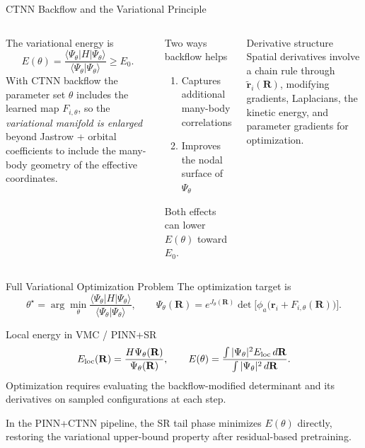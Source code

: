 \documentclass[aspectratio=169,10pt]{beamer}
\begin{document}
\begin{frame}{CTNN Backflow and the Variational Principle}
  \begin{columns}[T]
      The variational energy is
      \[
        E(\theta)
        =\frac{\langle\Psi_\theta|H|\Psi_\theta\rangle}
              {\langle\Psi_\theta|\Psi_\theta\rangle}
        \ge E_0.
      \]
      With CTNN backflow the parameter set $\theta$ includes the
      learned map $F_{i,\theta}$, so the \emph{variational manifold
      is enlarged} beyond Jastrow + orbital coefficients to include
      the many-body geometry of the effective coordinates.
      \begin{block}{Two ways backflow helps}
        \begin{enumerate}
          \item Captures additional many-body correlations
          \item Improves the nodal surface of $\Psi_\theta$
        \end{enumerate}
        Both effects can lower $E(\theta)$ toward $E_0$.
      \end{block}
      \vspace{0.2cm}
      \begin{alertblock}{Derivative structure}
        Spatial derivatives involve a chain rule through
        $\tilde{\mathbf{r}}_i(\mathbf{R})$, modifying gradients,
        Laplacians, the kinetic energy, and parameter gradients for
        optimization.
      \end{alertblock}
  \end{columns}
\end{frame}

\begin{frame}{Full Variational Optimization Problem}
The optimization target is
\[
  \theta^\star
  = \arg\min_\theta
    \frac{\langle\Psi_\theta|H|\Psi_\theta\rangle}
         {\langle\Psi_\theta|\Psi_\theta\rangle},
  \qquad
  \Psi_\theta(\mathbf{R})
  = e^{J_\theta(\mathbf{R})}
    \det\!\bigl[\phi_a\!\bigl(\mathbf{r}_i+F_{i,\theta}(\mathbf{R})\bigr)\bigr].
\]

\begin{block}{Local energy in VMC / PINN+SR}
  \[
    E_{\rm loc}(\mathbf{R})
    = \frac{H\Psi_\theta(\mathbf{R})}{\Psi_\theta(\mathbf{R})},
    \qquad
    E(\theta)
    = \frac{\int|\Psi_\theta|^2 E_{\rm loc}\,d\mathbf{R}}
           {\int|\Psi_\theta|^2\,d\mathbf{R}}.
  \]
  Optimization requires evaluating the backflow-modified determinant
  and its derivatives on sampled configurations at each step.
\end{block}
\vspace{0.2cm}
In the PINN+CTNN pipeline, the SR tail phase minimizes $E(\theta)$
directly, restoring the variational upper-bound property after
residual-based pretraining.
\end{frame}
\end{document}
